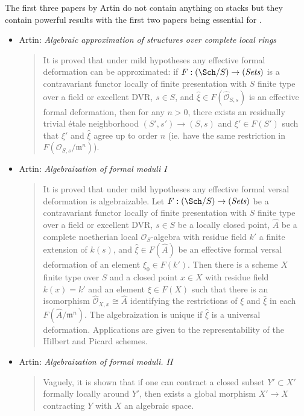 \noindent
The first three papers by Artin do not contain anything on stacks but they
contain powerful results with the first two papers being essential for
\cite{ArtinVersal}.
\begin{itemize}
\item Artin: \emph{Algebraic approximation of structures over
complete local rings} \cite{Artin-Algebraic-Approximation}
\begin{quote}
It is proved that under mild hypotheses any effective formal deformation can be
approximated: if $F: (\Sch/S) \to (\textit{Sets})$
is a contravariant functor
locally of finite presentation with $S$ finite type over a field or excellent
DVR, $s \in S$, and $\hat{\xi} \in F(\hat{\mathcal{O}}_{S, s})$ is an effective
formal
deformation, then for any $n > 0$, there exists an residually trivial \'etale
neighborhood $(S', s') \to (S, s)$ and $\xi' \in F(S')$ such that $\xi'$ and
$\hat{\xi}$ agree up to order $n$ (ie. have the same restriction in
$F(\mathcal{O}_{S, s} / \mathfrak m^n)$).
\end{quote}
\item
Artin: \emph{Algebraization of formal moduli I} \cite{ArtinI}
\begin{quote}
It is proved that under mild hypotheses any effective formal versal deformation
is algebraizable. Let $F: (\Sch/S) \to (\textit{Sets})$ be a
contravariant functor
locally of finite presentation with $S$ finite type over a field or excellent
DVR, $s \in S$ be a locally closed point, $\hat A$ be a complete noetherian
local $\mathcal{O}_S$-algebra with residue field $k'$ a finite extension of
$k(s)$,
and $\hat{\xi} \in F(\hat A)$ be an effective formal versal deformation of an
element $\xi_0 \in F(k')$. Then there is a scheme $X$ finite type over $S$ and
a closed point $x \in X$ with residue field $k(x) = k'$ and an element $\xi \in
F(X)$ such that there is an isomorphism $\hat{\mathcal{O}}_{X, x} \cong \hat{A}$
identifying the restrictions of $\xi$ and $\hat{\xi}$ in each $F(\hat A /
\mathfrak m^n)$. The algebraization is unique if $\hat{\xi}$ is a universal
deformation. Applications are given to the representability of the Hilbert
and Picard schemes.
\end{quote}
\item Artin: \emph{Algebraization of formal moduli. II}
\cite{ArtinII}
\begin{quote}
Vaguely, it is shown that if one can contract a closed subset $Y' \subset X'$
formally locally around $Y'$, then exists a global morphism $X' \to X$
contracting $Y$ with $X$ an algebraic space.

\end{quote}
\end{itemize}
